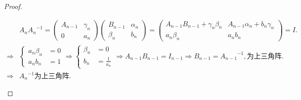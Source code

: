 \documentclass{article}
\begin{document}
\begin{enumerate}
\begin{proof}
\begin{enumerate}
\begin{enumerate}
                    \begin{align*}
                        &A_{n} {A_{n}}^{-1}=
                        \begin{pmatrix}
                            A_{n-1} & \gamma_{n}\\
                            0 & a_{n}
                        \end{pmatrix}
                        \begin{pmatrix}
                            B_{n-1} & \alpha_{n}\\
                            \beta_{n} &b_{n}
                        \end{pmatrix}
                        =
                        \begin{pmatrix}
                            A_{n-1} B_{n-1}+\gamma_{n}\beta_{n} & A_{n-1}\alpha_{n}+b_{n}\gamma_{n}\\
                            a_{n}\beta_{n} & a_{n}b_{n} 
                        \end{pmatrix}
                        =I.\\
                        \Rightarrow
                        &\begin{cases}
                            a_{n}\beta_{n}&=0\\
                            a_{n}b_{n}&=1
                        \end{cases}
                        \Rightarrow
                        \begin{cases}
                            \beta_{n}&=0\\
                            b_{n}&=\frac{1}{a_{n}}
                        \end{cases}
                        \Rightarrow
                        A_{n-1}B_{n-1}=I_{n-1}
                        \Rightarrow
                        B_{n-1}={A_{n-1}}^{-1},\mbox{为上三角阵}.\\
                        \Rightarrow
                        &{A_{n}}^{-1}\mbox{为上三角阵}.
                    \end{align*}
                \end{enumerate}
            \end{enumerate}
        \end{proof}
    \end{enumerate}
\end{document}
